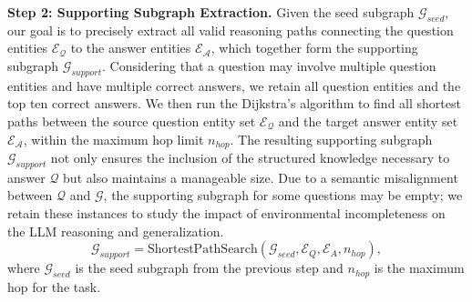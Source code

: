 \documentclass{article} %
\begin{document}
\textbf{Step 2: Supporting Subgraph Extraction.}
Given the seed subgraph $\mathcal{G}_{seed}$, our goal is to precisely extract all valid reasoning paths connecting the question entities $\mathcal{E}_\mathcal{Q}$ to the answer entities $\mathcal{E}_\mathcal{A}$, which together form the supporting subgraph $\mathcal{G}_{support}$. Considering that a question may involve multiple question entities and have multiple correct answers, we retain all question entities and the top ten correct answers. We then run the Dijkstra's algorithm to find all shortest paths between the source question entity set $\mathcal{E}_\mathcal{Q}$ and the target answer entity set $\mathcal{E}_\mathcal{A}$, within the maximum hop limit $n_{hop}$. The resulting supporting subgraph $\mathcal{G}_{support}$ not only ensures the inclusion of the structured knowledge necessary to answer $\mathcal{Q}$ but also maintains a manageable size. Due to a semantic misalignment between $\mathcal{Q}$ and $\mathcal{G}$, the supporting subgraph for some questions may be empty; we retain these instances to study the impact of environmental incompleteness on the LLM reasoning and generalization.
\begin{equation}
    \mathcal{G}_{support} = \text{ShortestPathSearch}(\mathcal{G}_{seed}, \mathcal{E}_Q, \mathcal{E}_A, n_{hop}),
\end{equation}
where $\mathcal{G}_{seed}$ is the seed subgraph from the previous step and $n_{hop}$ is the maximum hop for the task.
\end{document}
